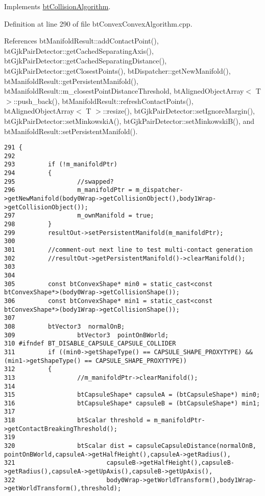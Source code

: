 Implements \hyperlink{classbt_collision_algorithm}{btCollisionAlgorithm}.

Definition at line 290 of file btConvexConvexAlgorithm.cpp.

References btManifoldResult::addContactPoint(), btGjkPairDetector::getCachedSeparatingAxis(), btGjkPairDetector::getCachedSeparatingDistance(), btGjkPairDetector::getClosestPoints(), btDispatcher::getNewManifold(), btManifoldResult::getPersistentManifold(), btManifoldResult::m\_\-closestPointDistanceThreshold, btAlignedObjectArray$<$ T $>$::push\_\-back(), btManifoldResult::refreshContactPoints(), btAlignedObjectArray$<$ T $>$::resize(), btGjkPairDetector::setIgnoreMargin(), btGjkPairDetector::setMinkowskiA(), btGjkPairDetector::setMinkowskiB(), and btManifoldResult::setPersistentManifold().

\begin{Code}\begin{verbatim}291 {
292 
293         if (!m_manifoldPtr)
294         {
295                 //swapped?
296                 m_manifoldPtr = m_dispatcher->getNewManifold(body0Wrap->getCollisionObject(),body1Wrap->getCollisionObject());
297                 m_ownManifold = true;
298         }
299         resultOut->setPersistentManifold(m_manifoldPtr);
300 
301         //comment-out next line to test multi-contact generation
302         //resultOut->getPersistentManifold()->clearManifold();
303         
304 
305         const btConvexShape* min0 = static_cast<const btConvexShape*>(body0Wrap->getCollisionShape());
306         const btConvexShape* min1 = static_cast<const btConvexShape*>(body1Wrap->getCollisionShape());
307 
308         btVector3  normalOnB;
309                 btVector3  pointOnBWorld;
310 #ifndef BT_DISABLE_CAPSULE_CAPSULE_COLLIDER
311         if ((min0->getShapeType() == CAPSULE_SHAPE_PROXYTYPE) && (min1->getShapeType() == CAPSULE_SHAPE_PROXYTYPE))
312         {
313                 //m_manifoldPtr->clearManifold();
314 
315                 btCapsuleShape* capsuleA = (btCapsuleShape*) min0;
316                 btCapsuleShape* capsuleB = (btCapsuleShape*) min1;
317                 
318                 btScalar threshold = m_manifoldPtr->getContactBreakingThreshold();
319 
320                 btScalar dist = capsuleCapsuleDistance(normalOnB,       pointOnBWorld,capsuleA->getHalfHeight(),capsuleA->getRadius(),
321                         capsuleB->getHalfHeight(),capsuleB->getRadius(),capsuleA->getUpAxis(),capsuleB->getUpAxis(),
322                         body0Wrap->getWorldTransform(),body1Wrap->getWorldTransform(),threshold);

\end{verbatim}
\end{Code}
